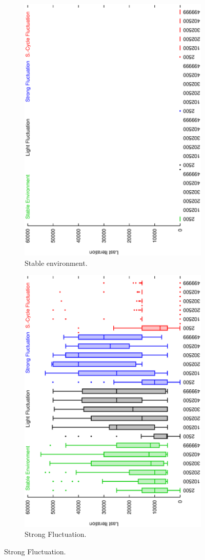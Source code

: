 \begin{figure}[H]
\begin{subfigure}{.25\textwidth}
  \centering
  \includegraphics[width=.7\linewidth, angle =-90]{img/boxendingsFailedstable.eps}
  \caption{Stable environment.}
  \label{fig:sfig1}
\end{subfigure}%
\begin{subfigure}{.25\textwidth}
  \centering
  \includegraphics[width=.7\linewidth, angle =-90]{img/boxendingsFailedvariation.eps}
  \caption{Strong Fluctuation.}
  \label{fig:sfig2}
\end{subfigure}


\end{figure}
